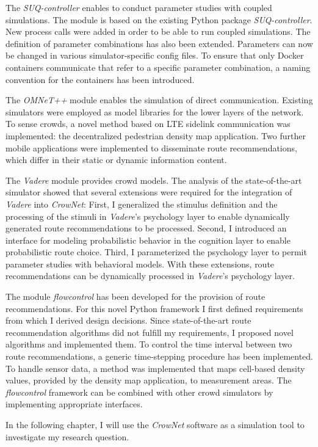 The \textit{SUQ-controller} enables to conduct parameter studies with coupled simulations. The module is based on the existing Python package \textit{SUQ-controller}. New process calls were added in order to be able to run coupled simulations. The definition of parameter combinations has also been extended. Parameters can now be changed in various simulator-specific config files. To ensure that only Docker containers communicate that refer to a specific parameter combination, a naming convention for the containers has been introduced.

The \textit{OMNeT++} module enables the simulation of direct communication. Existing simulators were employed as model libraries for the lower layers of the network. To sense crowds, a novel method based on LTE sidelink communication was implemented: the decentralized pedestrian density map application. Two further mobile applications were implemented to disseminate route recommendations, which differ in their static or dynamic information content.

The \textit{Vadere} module provides crowd models. The analysis of the state-of-the-art simulator showed that several extensions were required for the integration of \textit{Vadere} into \textit{CrowNet}: First, I generalized the stimulus definition and the processing of the stimuli in \textit{Vadere}'s psychology layer to enable dynamically generated route recommendations to be processed. Second, I introduced an interface for modeling probabilistic behavior in the cognition layer to enable probabilistic route choice. Third, I parameterized the psychology layer to permit parameter studies with behavioral models. With these extensions, route recommendations can be dynamically processed in \textit{Vadere}'s psychology layer. 

The module \textit{flowcontrol} has been developed for the provision of route recommendations. For this novel Python framework I first defined requirements from which I derived design decisions. Since state-of-the-art route recommendation algorithms did not fulfill my requirements, I proposed novel algorithms and implemented them. To control the time interval between two route recommendations, a generic time-stepping procedure has been implemented. To handle sensor data, a method was implemented that maps cell-based density values, provided by the density map application, to measurement areas. The \textit{flowcontrol} framework can be combined with other crowd simulators by implementing appropriate interfaces.


In the following chapter, I will use the \textit{CrowNet} software as a simulation tool to investigate my research question.